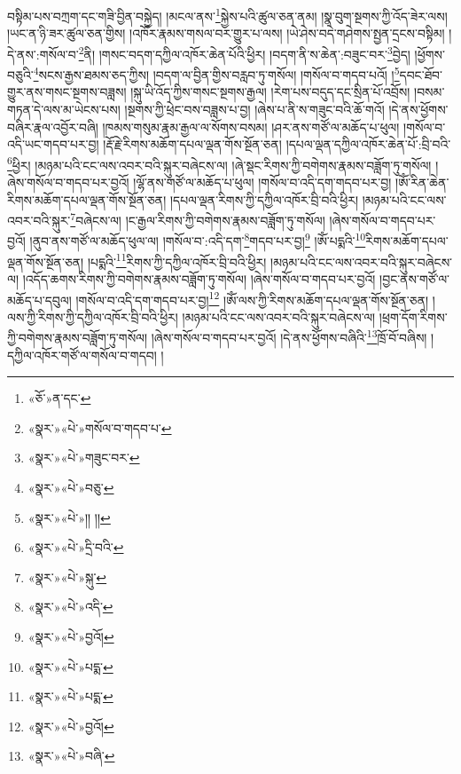 བསྟིམ་པས་བཀྲག་དང་གཟི་བྱིན་བསྐྱེད། །མངལ་ནས་\footnote{«ཅོ་»ན་དང་}སྐྱེས་པའི་ཚུལ་ཅན་ནམ། །སྣ་བུག་སྔགས་ཀྱི་འོད་ཟེར་ལས། །ཡང་ན་ཉི་ཟར་ཚུལ་ཅན་གྱིས། །འཁོར་རྣམས་གསལ་བར་གྱུར་པ་ལས། །ཡེ་ཤེས་བདེ་གཤེགས་སྤྱན་དྲངས་བསྟིམ། །དེ་ནས་:གསོལ་བ་\footnote{«སྣར་»«པེ་»གསོལ་བ་གདབ་པ་}ནི། །གསང་བདག་དཀྱིལ་འཁོར་ཆེན་པོའི་ཕྱིར། །བདག་ནི་ས་ཆེན་:བཟུང་བར་\footnote{«སྣར་»«པེ་»གཟུང་བར་}བྱེད། །ཕྱོགས་བཅུའི་\footnote{«སྣར་»«པེ་»བཅུ་}སངས་རྒྱས་ཐམས་ཅད་ཀྱིས། །བདག་ལ་བྱིན་གྱིས་བརླབ་ཏུ་གསོལ། །གསོལ་བ་གདབ་པའོ། །\footnote{«སྣར་»«པེ་»།། །།}དབང་ཐོབ་གྱུར་ནས་གསང་སྔགས་བཟླས། །སྐུ་ཡི་འོད་ཀྱིས་གསང་སྔགས་རྒྱལ། །རེག་པས་བདུད་དང་སྲིན་པོ་འབྲོས། །བསམ་གཏན་དེ་ལས་མ་ཡེངས་པས། །སྔགས་ཀྱི་ཕྲེང་བས་བཟླས་པ་བྱ། །ཞེས་པ་ནི་ས་གཟུང་བའི་ཆོ་གའོ། །དེ་ནས་ཕྱོགས་བཞིར་རྣལ་འབྱོར་བཞི། །ཁམས་གསུམ་རྣམ་རྒྱལ་ལ་སོགས་བསམ། །ཤར་ནས་གཙོ་ལ་མཆོད་པ་ཕུལ། །གསོལ་བ་འདི་ཡང་གདབ་པར་བྱ། །རྡོ་རྗེ་རིགས་མཆོག་དཔལ་ལྡན་གོས་སྔོན་ཅན། །དཔལ་ལྡན་དཀྱིལ་འཁོར་ཆེན་པོ་:བྲི་བའི་\footnote{«སྣར་»«པེ་»དྲི་བའི་}ཕྱིར། །མཉམ་པའི་ངང་ལས་འབར་བའི་སྐུར་བཞེངས་ལ། །ཞེ་སྡང་རིགས་ཀྱི་བགེགས་རྣམས་བཟློག་ཏུ་གསོལ། །ཞེས་གསོལ་བ་གདབ་པར་བྱའོ། །ལྷོ་ནས་གཙོ་ལ་མཆོད་པ་ཕུལ། །གསོལ་བ་འདི་དག་གདབ་པར་བྱ། །ཨོཾ་རིན་ཆེན་རིགས་མཆོག་དཔལ་ལྡན་གོས་སྔོན་ཅན། །དཔལ་ལྡན་རིགས་ཀྱི་དཀྱིལ་འཁོར་བྲི་བའི་ཕྱིར། །མཉམ་པའི་ངང་ལས་འབར་བའི་སྐུར་\footnote{«སྣར་»«པེ་»སྐུ་}བཞེངས་ལ། །ང་རྒྱལ་རིགས་ཀྱི་བགེགས་རྣམས་བཟློག་ཏུ་གསོལ། །ཞེས་གསོལ་བ་གདབ་པར་བྱའོ། །ནུབ་ནས་གཙོ་ལ་མཆོད་ཕུལ་ལ། །གསོལ་བ་:འདི་དག་\footnote{«སྣར་»«པེ་»འདི་}གདབ་པར་བྱ།\footnote{«སྣར་»«པེ་»བྱའོ།} །ཨོཾ་པདྨའི་\footnote{«སྣར་»«པེ་»པདྨ་}རིགས་མཆོག་དཔལ་ལྡན་གོས་སྔོན་ཅན། །པདྨའི་\footnote{«སྣར་»«པེ་»པདྨ་}རིགས་ཀྱི་དཀྱིལ་འཁོར་བྲི་བའི་ཕྱིར། །མཉམ་པའི་ངང་ལས་འབར་བའི་སྐུར་བཞེངས་ལ། །འདོད་ཆགས་རིགས་ཀྱི་བགེགས་རྣམས་བཟློག་ཏུ་གསོལ། །ཞེས་གསོལ་བ་གདབ་པར་བྱའོ། །བྱང་ནས་གཙོ་ལ་མཆོད་པ་དབུལ། །གསོལ་བ་འདི་དག་གདབ་པར་བྱ།\footnote{«སྣར་»«པེ་»བྱའོ།} །ཨོཾ་ལས་ཀྱི་རིགས་མཆོག་དཔལ་ལྡན་གོས་སྔོན་ཅན། །ལས་ཀྱི་རིགས་ཀྱི་དཀྱིལ་འཁོར་བྲི་བའི་ཕྱིར། །མཉམ་པའི་ངང་ལས་འབར་བའི་སྐུར་བཞེངས་ལ། །ཕྲག་དོག་རིགས་ཀྱི་བགེགས་རྣམས་བཟློག་ཏུ་གསོལ། །ཞེས་གསོལ་བ་གདབ་པར་བྱའོ། །དེ་ནས་ཕྱོགས་བཞིའི་\footnote{«སྣར་»«པེ་»བཞི་}ཁྲོ་བོ་བཞིས། །དཀྱིལ་འཁོར་གཙོ་ལ་གསོལ་བ་གདབ། །
